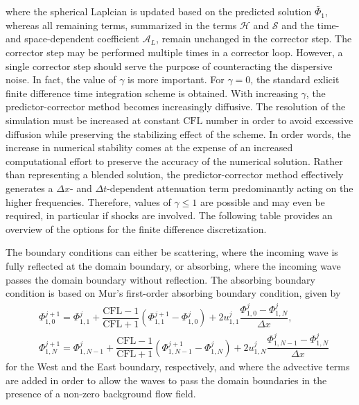 where the spherical Laplcian is updated based on the predicted solution $\widetilde{\Phi_1}$, whereas all remaining terms, summarized in the terms $\mathcal{H}$ and $\mathcal{S}$ and the time- and space-dependent coefficient $\mathcal{A}_L$, remain unchanged in the corrector step. The corrector step may be performed multiple times in a corrector loop. However, a single corrector step should serve the purpose of counteracting the dispersive noise. In fact, the value of $\gamma$ is more important. For $\gamma=0$, the standard exlicit finite difference time integration scheme is obtained. With increasing $\gamma$, the predictor-corrector method becomes increasingly diffusive. The resolution of the simulation must be increased at constant $\mathrm{CFL}$ number in order to avoid excessive diffusion while preserving the stabilizing effect of the scheme. In order words, the increase in numerical stability comes at the expense of an increased computational effort to preserve the accuracy of the numerical solution. Rather than representing a blended solution, the predictor-corrector method effectively generates a $\Delta x$- and $\Delta t$-dependent attenuation term \citep{Nascimento_et_al_2010} predominantly acting on the higher frequencies. Therefore, values of $\gamma \le 1$ are possible and may even be required, in particular if shocks are involved. The following table provides an overview of the options for the finite difference discretization.

The boundary conditions can either be scattering, where the incoming wave is fully reflected at the domain boundary, or absorbing, where the incoming wave passes the domain boundary without reflection. The absorbing boundary condition is based on Mur's first-order absorbing boundary condition, given by \citep{Mur_1981}
\begin{align}
& \Phi_{1,0}^{j+1} = \Phi_{1,1}^{j} + \dfrac{\mathrm{CFL-1}}{\mathrm{CFL}+1}\left(\Phi_{1,1}^{j+1}-\Phi_{1,0}^{j}\right)
+ 2u_{1,1}^{j}\dfrac{\Phi_{1,0}^{j} - \Phi_{1,N}^{j}}{\Delta x},
\label{eq:Mur_West} \\[4pt]
& \Phi_{1,N}^{j+1} = \Phi_{1,N-1}^{j} + \dfrac{\mathrm{CFL-1}}{\mathrm{CFL}+1}\left(\Phi_{1,N-1}^{j+1}-\Phi_{1,N}^{j}\right)
+ 2u_{1,N}^{j}\dfrac{\Phi_{1,N-1}^{j} - \Phi_{1,N}^{j}}{\Delta x}
\label{eq:Mur_East}
\end{align}
for the West and the East boundary, respectively, and where the advective terms are added in order to allow the waves to pass the domain boundaries in the presence of a non-zero background flow field.


